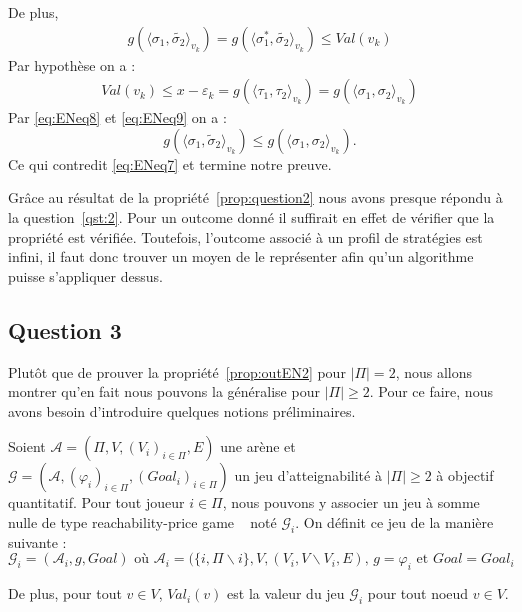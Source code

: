 \begin{demonstration}
\begin{itemize}
	De plus, 
	\begin{align}
		g(\langle \sigma_1, \tilde{\sigma_2} \rangle_{v_k}) = g( \langle \sigma_1^*, \tilde{\sigma_2} \rangle_{v_k}) \leq Val(v_k) \label{eq:ENeq8}
	\end{align}
	Par hypothèse on a :
	\begin{align}
		Val(v_k) \leq x - \varepsilon_k = g(\langle \tau_1, \tau_2 \rangle_{v_k} ) = g(\langle \sigma_1, \sigma_2 \rangle_{v_k}) \label{eq:ENeq9}
	\end{align}
	Par \eqref{eq:ENeq8} et \eqref{eq:ENeq9} on a : 
	$$ g(\langle \sigma_1, \tilde{\sigma}_2 \rangle_{v_k}) \leq g( \langle \sigma_1, \sigma_2 \rangle_{v_k}).$$
	Ce qui contredit \eqref{eq:ENeq7} et termine notre preuve.
	\end{itemize}
	
\end{demonstration}

Grâce au résultat de la propriété~\ref{prop:question2} nous avons presque répondu à la question~\ref{qst:2}. Pour un outcome donné il suffirait en effet de vérifier que la propriété est vérifiée. Toutefois, l'outcome associé à un profil de stratégies est infini, il faut donc trouver un moyen de le représenter afin qu'un algorithme puisse s'appliquer dessus.

\subsection{Question 3}
Plutôt que de prouver la propriété~\ref{prop:outEN2} pour $|\Pi|= 2$, nous allons montrer qu'en fait nous pouvons la généralise pour $|\Pi| \geq 2 .$ Pour ce faire, nous avons besoin d'introduire quelques notions préliminaires.


\begin{defi}
	\label{defi:coalGame}
 Soient $\mathcal{A} = (\Pi, V, (V_{i})_{i\in\Pi}, E)$ une arène et $\mathcal{G} = (\mathcal{A}, (\varphi _{i})_{i\in\Pi}, (Goal_{i})_{i\in\Pi})$ un jeu d'atteignabilité à $|\Pi| \geq 2$ à objectif quantitatif.
Pour tout joueur $i \in \Pi$, nous pouvons y associer un jeu à somme nulle de type \og reachability-price game \fg~ noté $\mathcal{G}_{i}$.
On définit ce jeu de la manière suivante : 
$$ \displaystyle \mathcal{G}_{i}= (\mathcal{A}_{i}, g , Goal) \text{ où } \mathcal{A}_{i} = (\{i,\Pi\backslash{i}\}, V, (V_{i},V\backslash V_i,E) \text{, } g = \varphi_i \text{ et } Goal = Goal_i$$

\noindent De plus, pour tout $v\in V$, $Val_i(v)$ est la valeur du jeu $\mathcal{G}_i$ pour tout noeud $v\in V$. 
\end{defi} 

